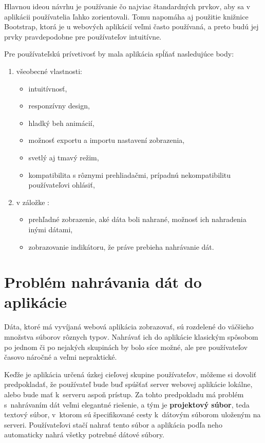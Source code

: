 Hlavnou ideou návrhu je používanie čo najviac štandardných prvkov, aby sa v aplikácii používatelia ľahko zorientovali. Tomu napomáha aj použitie knižnice Bootstrap, ktorá je u webových aplikácií veľmi často používaná, a preto budú jej prvky pravdepodobne pre používateľov intuitívne.

Pre používateľskú prívetivosť by mala aplikácia spĺňať nasledujúce body:

\begin{enumerate}
    \item všeobecné vlastnosti:
    \begin{itemize}
        \item intuitívnosť,
        \item responzívny design,
        \item hladký beh animácií,
        \item možnosť exportu a importu nastavení zobrazenia,
        \item svetlý aj tmavý režim,
        \item kompatibilita s rôznymi prehliadačmi, prípadnú nekompatibilitu používateľovi ohlásiť,
    \end{itemize}
    \item v záložke :
    \begin{itemize}
        \item prehľadné zobrazenie, aké dáta boli nahrané, možnosť ich nahradenia inými dátami,
        \item zobrazovanie indikátoru, že práve prebieha nahrávanie dát.
    \end{itemize}
\end{enumerate}

\section{Problém nahrávania dát do aplikácie}

Dáta, ktoré má vyvíjaná webová aplikácia zobrazovať, sú rozdelené do väčšieho množstva súborov rôznych typov. Nahrávať ich do aplikácie klasickým spôsobom po jednom či po nejakých skupinách by bolo síce možné, ale pre používateľov časovo náročné a veľmi nepraktické.

Keďže je aplikácia určená úzkej cieľovej skupine používateľov, môžeme si dovoliť predpokladať, že používateľ bude buď spúšťať server webovej aplikácie lokálne, alebo bude mať k~serveru aspoň prístup. Za tohto predpokladu má problém s~nahrávaním dát veľmi elegantné riešenie, a tým je \textbf{projektový súbor}, teda textový súbor, v~ktorom sú špecifikované cesty k~dátovým súborom uloženým na serveri. Používateľovi stačí nahrať tento súbor a aplikácia podľa neho automaticky nahrá všetky potrebné dátové súbory.


